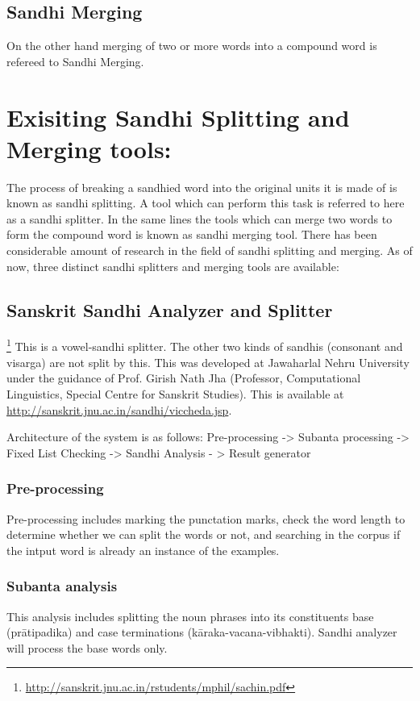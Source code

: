 \documentclass[11pt]{article}
\begin{document}
\subsection{Sandhi Merging}
On the other hand merging of two or more words into a compound word is refereed to Sandhi Merging.

\section{Exisiting Sandhi Splitting and Merging tools:}
The process of breaking a sandhied word into the original units it is made of is known as sandhi splitting. A tool which can perform this task is referred to here as a sandhi splitter.  In the same lines the tools which can merge two words to form the compound word is known as sandhi merging tool. 
There has been considerable amount of research in the field of sandhi splitting and merging. As of now, three distinct sandhi splitters and merging tools are available:



\subsection{Sanskrit Sandhi Analyzer and Splitter}\footnote{\url{http://sanskrit.jnu.ac.in/rstudents/mphil/sachin.pdf}} This is a vowel-sandhi splitter. The other two kinds of sandhis (consonant and visarga) are not split by this. This was developed at Jawaharlal Nehru University under the guidance of Prof. Girish Nath Jha (Professor, Computational Linguistics, Special Centre for Sanskrit Studies). This is available at \url{http://sanskrit.jnu.ac.in/sandhi/viccheda.jsp}.

Architecture of the system is as follows:
Pre-processing -> Subanta processing -> Fixed List Checking -> Sandhi Analysis - > Result generator

\subsubsection{Pre-processing}
Pre-processing includes marking the punctation marks, check the word length to determine whether we can split the words or not, and searching in the corpus if the intput word is already an instance of the examples.

\subsubsection{Subanta analysis}
This analysis includes splitting the noun phrases into its constituents base (prātipadika) and case terminations (kāraka-vacana-vibhakti).  Sandhi analyzer  will  process  the  base  words only. 
\end{document}
